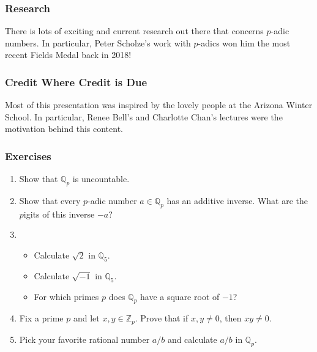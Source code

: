 \documentclass[10pt]{beamer}
\begin{document}
\begin{frame}
    \frametitle{Research}

    There is lots of exciting and current research out there that concerns \(p\)-adic numbers.
    In particular, Peter Scholze's work with \(p\)-adics won him the most recent Fields Medal back in 2018!

\end{frame}

\begin{frame}
    \frametitle{Credit Where Credit is Due}

    Most of this presentation was inspired by the lovely people at the Arizona Winter School.
    In particular, Renee Bell's and Charlotte Chan's lectures were the motivation behind this content.

\end{frame}

\begin{frame}
    \frametitle{Exercises}

    \begin{enumerate}
        \item Show that \(\mathbb{Q}_p\) is uncountable.
        \item Show that every \(p\)-adic number \(a\in\mathbb{Q}_p\) has an additive inverse.
        What are the \(p\)igits of this inverse \(-a\)?
        \item \begin{itemize}
            \item Calculate \(\sqrt{2}\) in \(\mathbb{Q}_5\).
            \item Calculate \(\sqrt{-1}\) in \(\mathbb{Q}_5\).
            \item For which primes \(p\) does \(\mathbb{Q}_p\) have a square root of \(-1\)?
        \end{itemize}
        \item Fix a prime \(p\) and let \(x,y\in\mathbb{Z}_p\).
        Prove that if \(x,y\neq 0\), then \(xy\neq 0\).
        \item Pick your favorite rational number \(a/b\) and calculate \(a/b\) in \(\mathbb{Q}_p\).
    \end{enumerate}

\end{frame}
\end{document}
